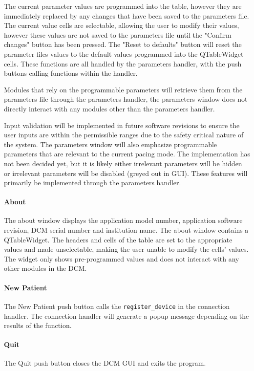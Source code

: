 \documentclass[12pt]{article}
\begin{document}
The current parameter values are programmed into the table, however they are immediately replaced by any changes that have been saved to the parameters file. The current value cells are selectable, allowing the user to modify their values, however these values are not saved to the parameters file until the "Confirm changes" button has been pressed. The "Reset to defaults" button will reset the parameter files values to the default values programmed into the QTableWidget cells. These functions are all handled by the parameters handler, with the push buttons calling functions within the handler.

Modules that rely on the programmable parameters will retrieve them from the parameters file through the parameters handler, the parameters window does not directly interact with any modules other than the parameters handler.

Input validation will be implemented in future software revisions to ensure the user inputs are within the permissible ranges due to the safety critical nature of the system. The parameters window will also emphasize programmable parameters that are relevant to the current pacing mode. The implementation has not been decided yet, but it is likely either irrelevant parameters will be hidden or irrelevant parameters will be disabled (greyed out in GUI). These features will primarily be implemented through the parameters handler.   

\paragraph{About}
The about window displays the application model number, application software revision, DCM serial number and institution name. The about window contains a QTableWidget. The headers and cells of the table are set to the appropriate values and made unselectable, making the user unable to modify the cells' values. The widget only shows pre-programmed values and does not interact with any other modules in the DCM.

\paragraph{New Patient}
The New Patient push button calls the \verb|register_device| in the connection handler. The connection handler will generate a popup message depending on the results of the function.

\paragraph{Quit}
The Quit push button closes the DCM GUI and exits the program.
\end{document}
